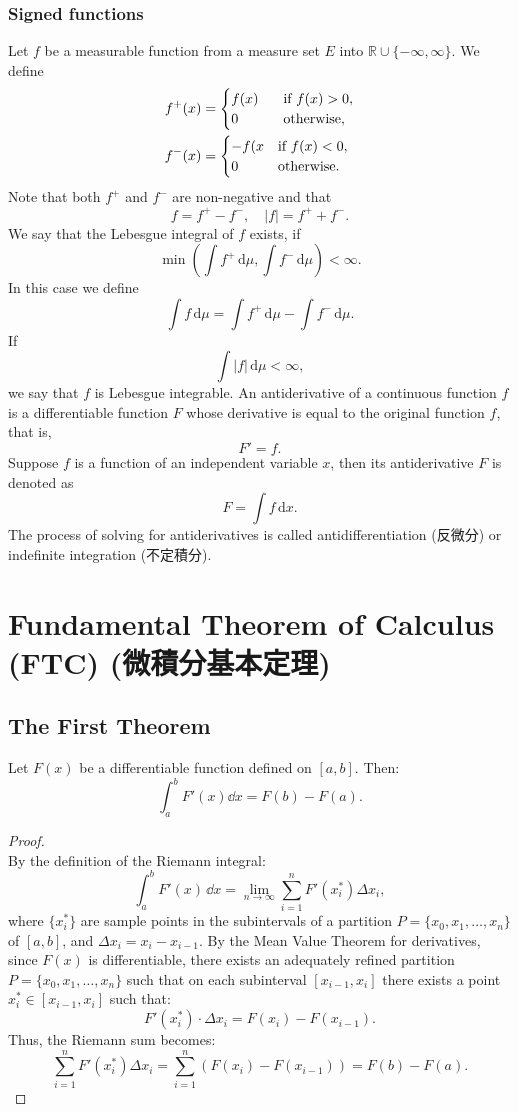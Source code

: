 \documentclass[a4paper,12pt]{report}
\begin{document}
\subsubsection{Signed functions}
Let $f$ be a measurable function from a measure set $E$ into $\mathbb{R}\cup\{-\infty,\infty\}$. We define
\[\begin{aligned}
f^{+}(x)&=
\begin{cases}
f(x)\hphantom{-}&\text{if }f(x)>0,\\
0&\text{otherwise},
\end{cases}\\
f^{-}(x)&=
\begin{cases}
-f(x&{\text{if }}f(x)<0,\\
0&\text{otherwise}.
\end{cases}
\end{aligned}\]
Note that both $f^+$ and $f^-$ are non-negative and that
\[f=f^+-f^-,\quad |f|=f^++f^-.\]
We say that the Lebesgue integral of $f$ exists, if
\[ \min \left(\int f^{+}\,\mathrm{d}\mu ,\int f^{-}\,\mathrm{d}\mu \right)<\infty .\]
In this case we define
\[ \int f\,\mathrm{d}\mu =\int f^{+}\,\mathrm{d}\mu -\int f^{-}\,\mathrm{d}\mu.\]
If
\[\int |f|\,\mathrm {d} \mu <\infty ,\]
we say that $f$ is Lebesgue integrable.
An antiderivative of a continuous function $f$ is a differentiable function $F$ whose derivative is equal to the original function $f$, that is,
\[F'=f.\]
Suppose $f$ is a function of an independent variable $x$, then its antiderivative $F$ is denoted as
\[F=\int f\,\mathrm{d}x.\]
The process of solving for antiderivatives is called antidifferentiation (反微分) or indefinite integration (不定積分).



\section{Fundamental Theorem of Calculus (FTC) (微積分基本定理)}
\subsection{The First Theorem}
Let $F(x)$ be a differentiable function defined on $[a,b]$. Then:
\[\int_a^bF'(x)\dd{x}=F(b)-F(a).\]
\begin{proof}\mbox{}\\
By the definition of the Riemann integral:
\[
\int_a^b F'(x)\, \dd{x} = \lim_{n \to \infty} \sum_{i=1}^n F'(x_i^*) \Delta x_i,
\]
where \( \{x_i^*\} \) are sample points in the subintervals of a partition \( P = \{x_0, x_1, \dots, x_n\} \) of \([a, b]\), and \( \Delta x_i = x_i - x_{i-1} \).
By the Mean Value Theorem for derivatives, since \( F(x) \) is differentiable, there exists an adequately refined partition \( P = \{x_0, x_1, \dots, x_n\} \) such that on each subinterval \([x_{i-1}, x_i]\) there exists a point \( x_i^* \in [x_{i-1}, x_i] \) such that:
\[
F'(x_i^*) \cdot \Delta x_i = F(x_i) - F(x_{i-1}).
\]
Thus, the Riemann sum becomes:
\[
\sum_{i=1}^n F'(x_i^*) \Delta x_i = \sum_{i=1}^n \left(F(x_i) - F(x_{i-1})\right) = F(b) - F(a).
\]
\end{proof}
\end{document}

